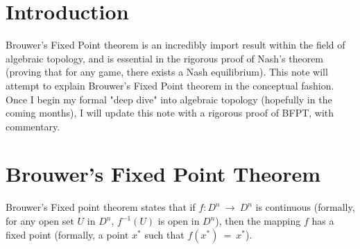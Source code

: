 \documentclass{article}
\title{A Conceptual Approach to Brouwer's Fixed Point Theorem - Math Mentorship Session #2}
\author{Jack Ceroni}
\date{February 2019}
\begin{document}
\maketitle
\newpage
\section{Introduction}
Brouwer's Fixed Point theorem is an incredibly import result within the field of algebraic topology, and is essential in the rigorous proof of Nash's theorem (proving that for any game, there exists a Nash equilibrium). This note will attempt to explain Brouwer's Fixed Point theorem in the conceptual fashion. Once I begin my formal "deep dive" into algebraic topology (hopefully in the coming months), I will update this note with a rigorous proof of BFPT, with commentary.
\section{Brouwer's Fixed Point Theorem}
Brouwer's Fixed point theorem states that if $f:D^n \ \rightarrow \ D^n$ is continuous (formally, for any open set $U$ in $D^n$, $f^{-1}(U)$ is open in $D^n$), then the mapping $f$ has a fixed point (formally, a point $x^{*}$ such that $f(x^{*}) \ = \ x^{*}$).
\end{document}
